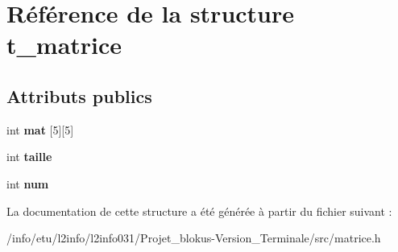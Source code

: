 \hypertarget{structt__matrice}{}\section{Référence de la structure t\+\_\+matrice}
\label{structt__matrice}
\subsection*{Attributs publics}
\begin{DoxyCompactItemize}
\item 
int {\bfseries mat} \mbox{[}5\mbox{]}\mbox{[}5\mbox{]}\hypertarget{structt__matrice_a0fbccd86aa607efff74de103029b3da0}{}\label{structt__matrice_a0fbccd86aa607efff74de103029b3da0}

\item 
int {\bfseries taille}\hypertarget{structt__matrice_a4df902007b2c86629d7f117a662d4485}{}\label{structt__matrice_a4df902007b2c86629d7f117a662d4485}

\item 
int {\bfseries num}\hypertarget{structt__matrice_ac7b3db002a24749884aeac8bc1a05ab1}{}\label{structt__matrice_ac7b3db002a24749884aeac8bc1a05ab1}

\end{DoxyCompactItemize}


La documentation de cette structure a été générée à partir du fichier suivant \+:\begin{DoxyCompactItemize}
\item 
/info/etu/l2info/l2info031/\+Projet\+\_\+blokus-\/\+Version\+\_\+\+Terminale/src/matrice.\+h\end{DoxyCompactItemize}
